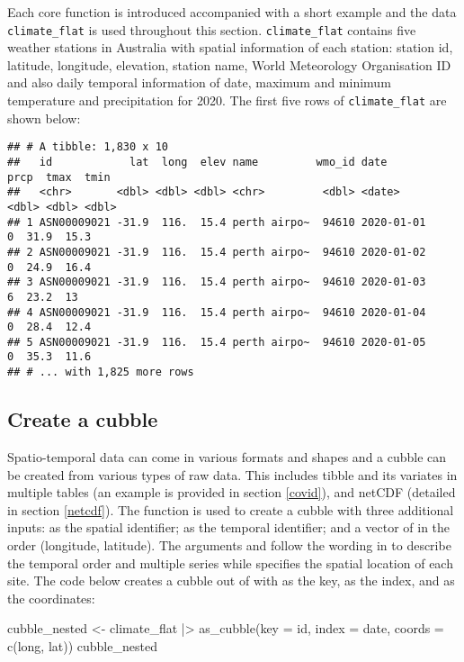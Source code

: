 \documentclass{article}
\newenvironment{Shaded}{\begin{snugshade}}{\end{snugshade}}
\newcommand{\AttributeTok}[1]{\textcolor[rgb]{0.77,0.63,0.00}{#1}}
\newcommand{\FunctionTok}[1]{\textcolor[rgb]{0.00,0.00,0.00}{#1}}
\newcommand{\NormalTok}[1]{#1}
\newcommand{\OtherTok}[1]{\textcolor[rgb]{0.56,0.35,0.01}{#1}}
\newcommand{\SpecialCharTok}[1]{\textcolor[rgb]{0.00,0.00,0.00}{#1}}
\begin{document}
Each core function is introduced accompanied with a short example and the data \texttt{climate\_flat} is used throughout this section. \texttt{climate\_flat} contains five weather stations in Australia with spatial information of each station: station id, latitude, longitude, elevation, station name, World Meteorology Organisation ID and also daily temporal information of date, maximum and minimum temperature and precipitation for 2020. The first five rows of \texttt{climate\_flat} are shown below:

\begin{verbatim}
## # A tibble: 1,830 x 10
##   id            lat  long  elev name         wmo_id date        prcp  tmax  tmin
##   <chr>       <dbl> <dbl> <dbl> <chr>         <dbl> <date>     <dbl> <dbl> <dbl>
## 1 ASN00009021 -31.9  116.  15.4 perth airpo~  94610 2020-01-01     0  31.9  15.3
## 2 ASN00009021 -31.9  116.  15.4 perth airpo~  94610 2020-01-02     0  24.9  16.4
## 3 ASN00009021 -31.9  116.  15.4 perth airpo~  94610 2020-01-03     6  23.2  13  
## 4 ASN00009021 -31.9  116.  15.4 perth airpo~  94610 2020-01-04     0  28.4  12.4
## 5 ASN00009021 -31.9  116.  15.4 perth airpo~  94610 2020-01-05     0  35.3  11.6
## # ... with 1,825 more rows
\end{verbatim}

\hypertarget{create}{%
\subsection{Create a cubble}\label{create}}

Spatio-temporal data can come in various formats and shapes and a cubble can be created from various types of raw data. This includes tibble and its variates in multiple tables (an example is provided in section \ref{covid}), and netCDF (detailed in section \ref{netcdf}). The function  is used to create a cubble with three additional inputs:  as the spatial identifier;  as the temporal identifier; and a vector of  in the order (longitude, latitude). The arguments  and  follow the wording in  to describe the temporal order and multiple series while  specifies the spatial location of each site. The code below creates a cubble out of  with  as the key,  as the index, and  as the coordinates:

\begin{Shaded}
\begin{Highlighting}[]
\NormalTok{cubble\_nested }\OtherTok{\textless{}{-}}\NormalTok{ climate\_flat }\SpecialCharTok{|\textgreater{}}
  \FunctionTok{as\_cubble}\NormalTok{(}\AttributeTok{key =}\NormalTok{ id, }\AttributeTok{index =}\NormalTok{ date, }\AttributeTok{coords =} \FunctionTok{c}\NormalTok{(long, lat))}
\NormalTok{cubble\_nested}
\end{Highlighting}
\end{Shaded}
\end{document}
